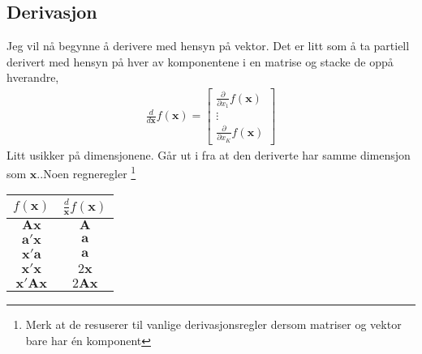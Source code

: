 \subsection{Derivasjon}
Jeg vil nå begynne å derivere med hensyn på vektor. Det er litt som å ta partiell derivert med hensyn på hver av komponentene i en matrise og stacke de oppå hverandre,
\begin{align}
\frac{d}{d\mathbf{x}}f(\mathbf{x}) = 
\begin{bmatrix}
\frac{\partial}{\partial x_1}f(\mathbf{x}) \\
\vdots \\
\frac{\partial}{\partial x_K}f(\mathbf{x})
\end{bmatrix}
\end{align}
Litt usikker på dimensjonene. Går ut i fra at den deriverte har samme dimensjon som $\mathbf{x}$..Noen regneregler \footnote{Merk at de resuserer til vanlige derivasjonsregler dersom matriser og vektor bare har én komponent}
\begin{center}
\begin{tabular}{ c|c } 
$f(\mathbf{x})$ & $\frac{d}{\mathbf{x}}f(\mathbf{x})$\\	
 \hline
$\mathbf{A}\mathbf{x}$ & $\mathbf{A}$  \\ 
$ \mathbf{a}'\mathbf{x}$ & $\mathbf{a} $ \\ 
$\mathbf{x}'\mathbf{a}$ & $\mathbf{a}$  \\ 
$\mathbf{x}'\mathbf{x}$ & $2\mathbf{x}$ \\
$\mathbf{x}'\mathbf{A}\mathbf{x}$ & $2\mathbf{A}\mathbf{x}$\\
 \hline
\end{tabular}
\end{center}
